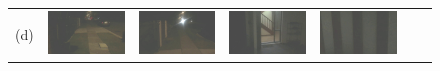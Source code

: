 \documentclass[letterpaper, 10 pt, conference]{ieeeconf}  %
\begin{document}
\begin{figure}
\begin{tabular*}{\textwidth}{ccccccc}
  (d) &
 \includegraphics[width=\imgW,height=\imgH]{rio-q1-2} &
 \includegraphics[width=\imgW,height=\imgH]{rio-q2-2} &
 \includegraphics[width=\imgW,height=\imgH]{rio-q4-2} &
 \includegraphics[width=\imgW,height=\imgH]{rio-r5-2} &

\end{tabular*}
\end{figure}
\end{document}
